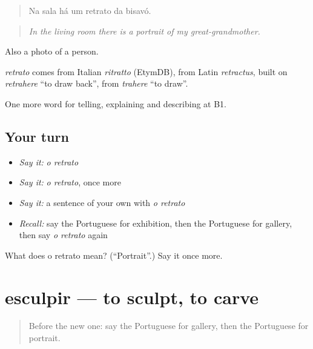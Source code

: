 \begin{quote}
Na sala há um retrato da bisavó.
\end{quote}

\begin{quote}
\emph{In the living room there is a portrait of my great-grandmother.}
\end{quote}

Also a photo of a person.

\begin{cousinweb}
\emph{retrato} comes from Italian \emph{ritratto} (EtymDB), from Latin \emph{retractus}, built on \emph{retrahere} \textquotedblleft{}to draw back\textquotedblright{}, from \emph{trahere} \textquotedblleft{}to draw\textquotedblright{}.
\end{cousinweb}

\begin{grammarlens}[title={What you've built}]
One more word for telling, explaining and describing at B1.
\end{grammarlens}

\subsection*{Your turn}
\begin{itemize}
\raggedright
  \item \emph{Say it:} \emph{o retrato}
  \item \emph{Say it:} \emph{o retrato}, once more
  \item \emph{Say it:} a sentence of your own with \emph{o retrato}
  \item \emph{Recall:} say the Portuguese for exhibition, then the Portuguese for gallery, then say \emph{o retrato} again
\end{itemize}

\begin{tcolorbox}[breakable,colback=teal!4,colframe=teal!35!black,title={Before you move on}]
What does o retrato mean? (\textquotedblleft{}Portrait\textquotedblright{}.) Say it once more.
\end{tcolorbox}
\section[esculpir]{esculpir — to sculpt, to carve}

\label{lesson:PT-C522-esculpir}



\begin{quote}
Before the new one: say the Portuguese for gallery, then the Portuguese for portrait.
\end{quote}

